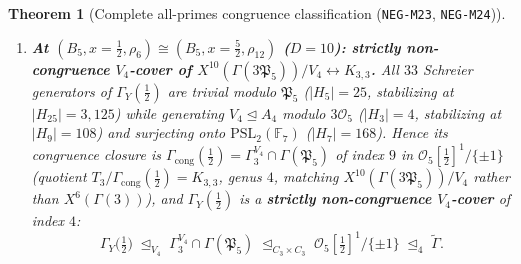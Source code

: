 \documentclass[11pt]{amsart}
\numberwithin{equation}{section}
\theoremstyle{plain}
\newtheorem{theorem}{Theorem}[section]
\theoremstyle{definition}\newtheorem{definition}[theorem]{Definition}
\theoremstyle{remark}\newtheorem{remark}[theorem]{Remark}
\newcommand{\F}{\mathbb{F}}
\newcommand{\calO}{\mathcal{O}}
\newcommand{\PSL}{\mathrm{PSL}}
\begin{document}
\begin{theorem}[Complete all-primes congruence classification (\texttt{NEG-M23}, \texttt{NEG-M24})]
\begin{enumerate}[label=(\alph*),nosep]
\begin{equation}\label{eq:tower_b5_52}
\Gamma_Y\bigl(\tfrac52\bigr) \;=\; \Gamma(3)\cap\Gamma(\mathfrak{P}_5) \;=\; \Gamma(3\mathfrak{P}_5) \;\trianglelefteq_{A_4\times C_3}\; \calO_5[\tfrac12]^1/\{\pm 1\} \;\trianglelefteq_4\; \tilde{\Gamma}.
\end{equation}
Thus $C_Y(\tfrac52,\rho_6)\cong C_Y(\tfrac12,\rho_{12})$ is a \textbf{genuine congruence Shimura curve} of principal-times-ramified level $3\mathfrak{P}_5$ (invisible to Borel $X_0^{10}(N)$ because $\Gamma(3)$ is principal and $\mathfrak{P}_5\mid 10$).
\item \textbf{At $(B_5, x=\tfrac12, \rho_6) \cong (B_5, x=\tfrac52, \rho_{12})$ ($D=10$): strictly non-congruence $V_4$-cover of $X^{10}(\Gamma(3\mathfrak{P}_5))/V_4\leftrightarrow K_{3,3}$.} All $33$ Schreier generators of $\Gamma_Y(\tfrac12)$ are trivial modulo $\mathfrak{P}_5$ ($|H_5|=25$, stabilizing at $|H_{25}|=3{,}125$) while generating $V_4\trianglelefteq A_4$ modulo $3\calO_5$ ($|H_3|=4$, stabilizing at $|H_9|=108$) and surjecting onto $\PSL_2(\F_7)$ ($|H_7|=168$). Hence its congruence closure is $\Gamma_{\mathrm{cong}}(\tfrac12)=\Gamma_3^{V_4}\cap\Gamma(\mathfrak{P}_5)$ of index $9$ in $\calO_5[\tfrac12]^1/\{\pm 1\}$ (quotient $T_3/\Gamma_{\mathrm{cong}}(\tfrac12)=K_{3,3}$, genus $4$, matching $X^{10}(\Gamma(3\mathfrak{P}_5))/V_4$ rather than $X^6(\Gamma(3))$), and $\Gamma_Y(\tfrac12)$ is a \textbf{strictly non-congruence $V_4$-cover} of index $4$:
\begin{equation}\label{eq:tower_b5_12}
\Gamma_Y\bigl(\tfrac12\bigr) \;\trianglelefteq_{V_4}\; \Gamma_3^{V_4}\cap\Gamma(\mathfrak{P}_5) \;\trianglelefteq_{C_3\times C_3}\; \calO_5[\tfrac12]^1/\{\pm 1\} \;\trianglelefteq_4\; \tilde{\Gamma}.
\end{equation}
\end{enumerate}
\end{theorem}
\end{document}
